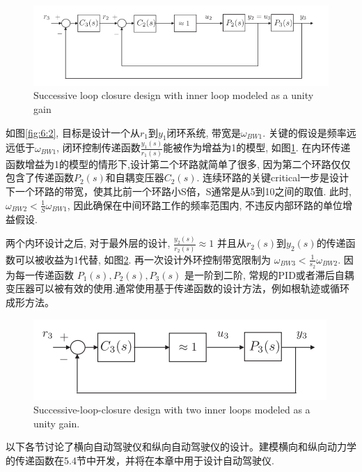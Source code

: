 \documentclass[UTF8,a4paper,10pt,nocolorlinks]{ctexart}
\begin{document}
    \begin{figure}[htpb]
        \centering %
        \includegraphics[width=\textwidth]{pictures/6_3.png} 
        \caption{Successive loop closure design with inner loop modeled as a unity
        gain}
        \label{fig:6:3}
    \end{figure}
    如图\ref{fig:6:2}, 目标是设计一个从$r_{1}$到$y_{1}$闭环系统, 带宽是$\omega_{BW1}$.
    关键的假设是频率远远低于$\omega_{BW1}$, 闭环控制传递函数$\frac{y_{1}(s)}{r_{1}(s)}$能被作为增益为1的模型, 如图\ref{fig:6:3}. 在内环传递函数增益为1的模型的情形下,设计第二个环路就简单了很多, 因为第二个环路仅仅包含了传递函数$P_{2}(s)$和自耦变压器$C_{2}(s)$. 
    连续环路的关键critical一步是设计下一个环路的带宽，使其比前一个环路小S倍，S通常是从5到10之间的取值. 此时,$\omega_{BW2} < \frac{1}{S} \omega_{BW1} $, 因此确保在中间环路工作的频率范围内, 不违反内部环路的单位增益假设.
    \par 两个内环设计之后, 对于最外层的设计, $\frac{y_{2}(s)}{r_{2}(s)} \approx 1 $ 并且从$r_{2}(s)$到$y_{2}(s)$的传递函数可以被收益为1代替, 如图\ref{fig:6:4}. 再一次设计外环控制带宽限制为 $\omega_{BW3} < \frac{1}{s_{2}} \omega_{BW2}$.
    因为每一传递函数 $P_{1}(s), P_{2}(s), P_{3}(s)$ 是一阶到二阶, 常规的PID或者滞后自耦变压器可以被有效的使用.通常使用基于传递函数的设计方法，例如根轨迹或循环成形方法。
    \begin{figure}[H]
        \centering %
        \includegraphics[width=\textwidth]{pictures/6_4.png} 
        \caption{Successive-loop-closure
        design with two inner loops modeled
        as a unity gain.}
        \label{fig:6:4}
    \end{figure}
    \par 以下各节讨论了横向自动驾驶仪和纵向自动驾驶仪的设计。建模横向和纵向动力学的传递函数在5.4节中开发，并将在本章中用于设计自动驾驶仪.
    \clearpage
\end{document}
